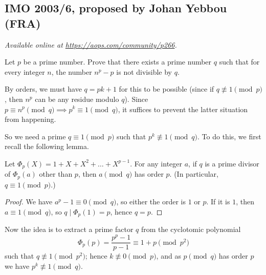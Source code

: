 \documentclass[11pt]{scrartcl}
\begin{document}
\subsection{IMO 2003/6, proposed by Johan Yebbou (FRA)}
\textsl{Available online at \url{https://aops.com/community/p266}.}
\begin{mdframed}[style=mdpurplebox,frametitle={Problem statement}]
Let $p$ be a prime number.
Prove that there exists a prime number $q$ such that for every integer $n$,
the number $n^p-p$ is not divisible by $q$.
\end{mdframed}
By orders, we must have $q=pk+1$ for this to be possible
(since if $q \not \equiv 1 \pmod p$, then $n^p$ can be any residue modulo $q$).
Since $p \equiv n^p \pmod q \implies p^k \equiv 1 \pmod q$,
it suffices to prevent the latter situation from happening.

So we need a prime $q \equiv 1 \pmod p$ such that $p^k \not\equiv 1 \pmod q$.
To do this, we first recall the following lemma.
\begin{lemma*}
  Let $\Phi_p(X) = 1 + X + X^2 + \dots + X^{p-1}$.
  For any integer $a$, if $q$ is a prime divisor of $\Phi_p(a)$ other than $p$,
  then $a \pmod q$ has order $p$. (In particular, $q \equiv 1 \pmod p$.)
\end{lemma*}
\begin{proof}
  We have $a^p-1 \equiv 0 \pmod q$, so either the order is $1$ or $p$.
  If it is $1$, then $a \equiv 1 \pmod q$, so $q \mid \Phi_p(1) = p$, hence $q = p$.
\end{proof}

Now the idea is to extract a prime factor $q$
from the cyclotomic polynomial
\[ \Phi_p(p) = \frac{p^p-1}{p-1} \equiv 1+p \pmod{p^2} \]
such that $q \not\equiv 1 \pmod{p^2}$;
hence $k \not\equiv 0 \pmod p$,
and as $p \pmod q$ has order $p$ we have $p^k \not\equiv 1 \pmod q$.
\pagebreak
\end{document}
